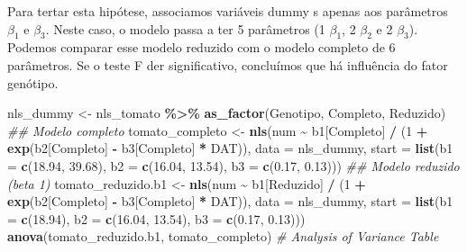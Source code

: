 \documentclass[
]{book}
\newenvironment{Shaded}{\begin{snugshade}}{\end{snugshade}}
\newcommand{\CommentTok}[1]{\textcolor[rgb]{0.56,0.35,0.01}{\textit{#1}}}
\newcommand{\DataTypeTok}[1]{\textcolor[rgb]{0.13,0.29,0.53}{#1}}
\newcommand{\DecValTok}[1]{\textcolor[rgb]{0.00,0.00,0.81}{#1}}
\newcommand{\FloatTok}[1]{\textcolor[rgb]{0.00,0.00,0.81}{#1}}
\newcommand{\KeywordTok}[1]{\textcolor[rgb]{0.13,0.29,0.53}{\textbf{#1}}}
\newcommand{\NormalTok}[1]{#1}
\newcommand{\OperatorTok}[1]{\textcolor[rgb]{0.81,0.36,0.00}{\textbf{#1}}}
\newcommand{\StringTok}[1]{\textcolor[rgb]{0.31,0.60,0.02}{#1}}
\numberwithin{equation}{section}
\newcommand{\indt}[1]{\index{#1|ST}}
\begin{document}
Para tertar esta hipótese, associamos variáveis dummy \indt{variáveis dummy}s apenas aos parâmetros \(\beta_1\) e \(\beta_3\). Neste caso, o modelo passa a ter 5 parâmetros (1 \(\beta_1\), 2 \(\beta_2\) e 2 \(\beta_3\)). Podemos comparar esse modelo reduzido com o modelo completo de 6 parâmetros. Se o teste F der significativo, concluímos que há influência do fator genótipo.

\begin{Shaded}
\begin{Highlighting}[]
\NormalTok{nls\_dummy \textless{}{-}}\StringTok{ }
\StringTok{  }\NormalTok{nls\_tomato }\OperatorTok{\%\textgreater{}\%}
\StringTok{  }\KeywordTok{as\_factor}\NormalTok{(Genotipo, Completo, Reduzido)}
\CommentTok{\#\# Modelo completo}
\NormalTok{tomato\_completo \textless{}{-}}\StringTok{ }
\StringTok{  }\KeywordTok{nls}\NormalTok{(num }\OperatorTok{\textasciitilde{}}\StringTok{ }\NormalTok{b1[Completo] }\OperatorTok{/}\StringTok{ }\NormalTok{(}\DecValTok{1} \OperatorTok{+}\StringTok{ }\KeywordTok{exp}\NormalTok{(b2[Completo] }\OperatorTok{{-}}\StringTok{ }\NormalTok{b3[Completo] }\OperatorTok{*}\StringTok{ }\NormalTok{DAT)), }
      \DataTypeTok{data =}\NormalTok{ nls\_dummy,}
      \DataTypeTok{start =} \KeywordTok{list}\NormalTok{(}\DataTypeTok{b1 =} \KeywordTok{c}\NormalTok{(}\FloatTok{18.94}\NormalTok{, }\FloatTok{39.68}\NormalTok{),}
                   \DataTypeTok{b2 =} \KeywordTok{c}\NormalTok{(}\FloatTok{16.04}\NormalTok{, }\FloatTok{13.54}\NormalTok{),}
                   \DataTypeTok{b3 =} \KeywordTok{c}\NormalTok{(}\FloatTok{0.17}\NormalTok{, }\FloatTok{0.13}\NormalTok{)))}
\CommentTok{\#\# Modelo reduzido (beta 1)}
\NormalTok{tomato\_reduzido.b1 \textless{}{-}}\StringTok{ }
\StringTok{  }\KeywordTok{nls}\NormalTok{(num }\OperatorTok{\textasciitilde{}}\StringTok{ }\NormalTok{b1[Reduzido] }\OperatorTok{/}\StringTok{ }\NormalTok{(}\DecValTok{1} \OperatorTok{+}\StringTok{ }\KeywordTok{exp}\NormalTok{(b2[Completo] }\OperatorTok{{-}}\StringTok{ }\NormalTok{b3[Completo] }\OperatorTok{*}\StringTok{ }\NormalTok{DAT)), }
      \DataTypeTok{data =}\NormalTok{ nls\_dummy,}
      \DataTypeTok{start =} \KeywordTok{list}\NormalTok{(}\DataTypeTok{b1 =} \KeywordTok{c}\NormalTok{(}\FloatTok{18.94}\NormalTok{),}
                   \DataTypeTok{b2 =} \KeywordTok{c}\NormalTok{(}\FloatTok{16.04}\NormalTok{, }\FloatTok{13.54}\NormalTok{),}
                   \DataTypeTok{b3 =} \KeywordTok{c}\NormalTok{(}\FloatTok{0.17}\NormalTok{, }\FloatTok{0.13}\NormalTok{)))}
\KeywordTok{anova}\NormalTok{(tomato\_reduzido.b1, tomato\_completo)}
\CommentTok{\# Analysis of Variance Table}

\end{Highlighting}
\end{Shaded}
\end{document}
